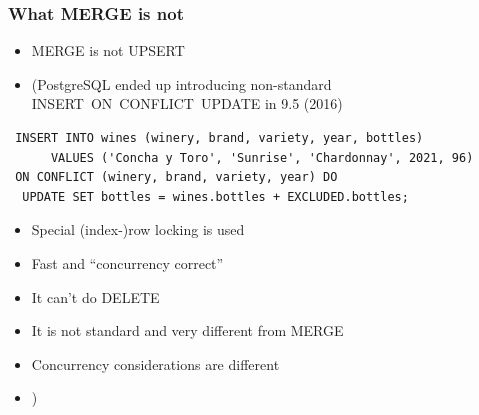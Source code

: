 \documentclass[ignorenonframetext,t]{beamer}
\begin{document}
\begin{frame}[fragile]
  \frametitle{What MERGE is not}
  \begin{itemize}
    \item MERGE is not UPSERT
    \item (PostgreSQL ended up introducing non-standard INSERT~ON~CONFLICT~UPDATE in 9.5 (2016)
  \end{itemize}

\begin{lstlisting}
 INSERT INTO wines (winery, brand, variety, year, bottles)
      VALUES ('Concha y Toro', 'Sunrise', 'Chardonnay', 2021, 96)
 ON CONFLICT (winery, brand, variety, year) DO
  UPDATE SET bottles = wines.bottles + EXCLUDED.bottles;
\end{lstlisting}

\pause
  \begin{itemize}
    \item \faThumbsOUp{} Special (index-)row locking is used
    \item \faThumbsOUp{} Fast and ``concurrency correct''
      \pause
    \item \faThumbsODown{} It can't do DELETE
    \item \faThumbsODown{} It is not standard and very different from MERGE
    \item \faThumbsODown{} Concurrency considerations are different
    \item<3> )
  \end{itemize}
\end{frame}

\end{document}
